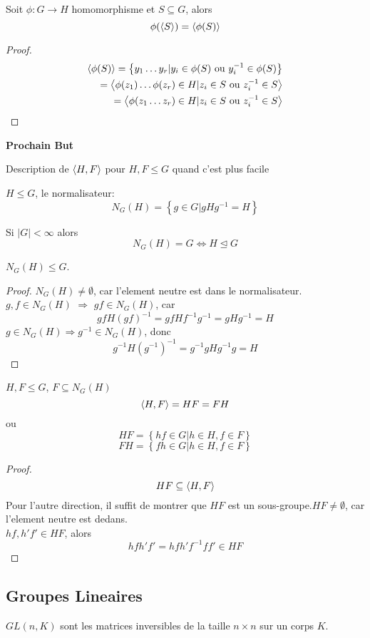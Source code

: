 \documentclass[../main.tex]{subfiles}
\begin{document}
\begin{crly}
Soit $\phi:G \to H$ homomorphisme et $S \subseteq G$, alors
\[ 
	\phi( \left\langle S\right\rangle)  = \left\langle\phi( S) \right\rangle
\]

\end{crly}
\begin{proof}
	\begin{align*}
		\left\langle\phi( S) \right\rangle = \left\{ y_1\ldots y_r | y_i \in \phi( S) \text{ ou } y ^{-1}_i \in \phi( S)  \right\} \\
		= \left\langle\phi( z_1) \ldots \phi( z_r) \in H | z_i \in S  \text{ ou } z_i^{-1}\in S\right\rangle\\
		= \left\langle\phi( z_1 \ldots z_r)  \in H | z_i \in S  \text{ ou } z_i^{-1}\in S\right\rangle\\
	\end{align*}
\end{proof}
\begin{center}
\textbf{Prochain But}
\end{center}
Description de $\left\langle H,F\right\rangle$ pour $H,F \leq G$ quand c'est plus facile
\begin{defn}
$H\leq G$, le normalisateur:
\[ 
	N_G( H) = \left\{ g \in G | gHg^{-1} = H \right\} 
\]

\end{defn}
\begin{rmq}
Si $|G| < \infty $ alors 
\[ 
	N_G ( H) = G \iff H \trianglelefteq G
\]

\end{rmq}
\begin{propo}
	$N_G( H) \leq G$.
\end{propo}
\begin{proof}
	$N_G( H) \neq \emptyset$, car l'element neutre est dans le normalisateur.\\
	$g,f \in N_G( H) $ $\Rightarrow$ $gf \in N_G( H) $, car 
	\[ 
		gf H ( gf) ^{-1}= gf H f^{-1}g^{-1}= gHg^{-1}= H
	\]
	$g \in N_G( H) \Rightarrow g^{-1}\in N_G( H) $, donc
	\[ 
	g^{-1}H ( g^{-1} )^{-1}= g^{-1}g H g^{-1}g = H
	\]
	
\end{proof}
\begin{propo}
	$H,F \leq G$, $F\subseteq N_G( H) $ 
	\[ 
		\left\langle H,F\right\rangle = HF =FH
	\]
	ou
	\[ 
	HF = \left\{ hf \in G | h \in H, f \in F \right\} 
	\]
	\[ 
	FH = \left\{ fh \in G | h \in H, f \in F \right\} 
	\]
	
	
\end{propo}
\begin{proof}
\[ 
	HF \subseteq \left\langle H,F\right\rangle
\]
Pour l'autre direction, il suffit de montrer que $HF$ est un sous-groupe.$HF\neq \emptyset$, car l'element neutre est dedans.\\
$hf, h'f' \in HF$, alors
\[ 
hfh'f' = hfh'f^{-1}ff' \in HF
\]


\end{proof}
\subsection{Groupes Lineaires}
\begin{defn}
	$GL( n,K) $ sont les matrices inversibles de la taille $n\times n$ sur un corps $K$.
\end{defn}
\end{document}
